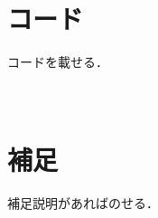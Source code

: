 \documentclass[a4paper,12pt]{jsarticle}
\begin{document}
\section{\\コード}


コードを載せる．

\newpage
\section{\\補足}

補足説明があればのせる．
\end{document}
